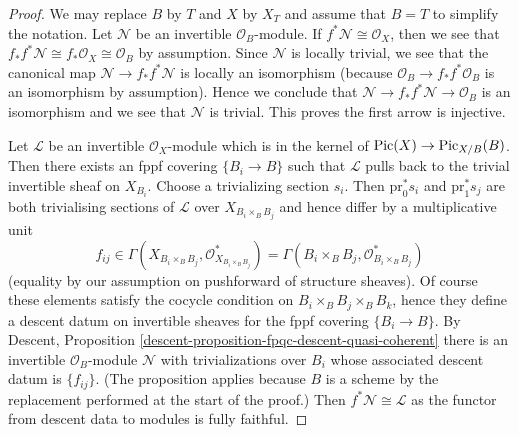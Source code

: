 \begin{proof}
We may replace $B$ by $T$ and $X$ by $X_T$ and assume that $B = T$
to simplify the notation. Let $\mathcal{N}$ be an invertible
$\mathcal{O}_B$-module. If $f^*\mathcal{N} \cong \mathcal{O}_X$, then
we see that $f_*f^*\mathcal{N} \cong f_*\mathcal{O}_X \cong \mathcal{O}_B$
by assumption. Since $\mathcal{N}$ is locally trivial, we see that
the canonical map $\mathcal{N} \to f_*f^*\mathcal{N}$ is locally
an isomorphism (because $\mathcal{O}_B \to f_*f^*\mathcal{O}_B$
is an isomorphism by assumption). Hence we conclude that
$\mathcal{N} \to f_*f^*\mathcal{N} \to \mathcal{O}_B$ is an isomorphism
and we see that $\mathcal{N}$ is trivial. This proves the first arrow
is injective.

\medskip\noindent
Let $\mathcal{L}$ be an invertible $\mathcal{O}_X$-module which is in
the kernel of $\mathop{\mathrm{Pic}}\nolimits(X) \to \mathrm{Pic}_{X/B}(B)$. Then there exists
an fppf covering $\{B_i \to B\}$ such that $\mathcal{L}$ pulls back
to the trivial invertible sheaf on $X_{B_i}$. Choose a trivializing
section $s_i$. Then $\text{pr}_0^*s_i$ and $\text{pr}_1^*s_j$ are both
trivialising sections of $\mathcal{L}$ over $X_{B_i \times_B B_j}$
and hence differ by a multiplicative unit
$$
f_{ij} \in
\Gamma(X_{B_i \times_B B_j}, \mathcal{O}_{X_{B_i \times_B B_j}}^*) =
\Gamma(B_i \times_B B_j, \mathcal{O}_{B_i \times_B B_j}^*)
$$
(equality by our assumption on pushforward of structure sheaves).
Of course these elements satisfy the cocycle condition on
$B_i \times_B B_j \times_B B_k$, hence they define a descent datum
on invertible sheaves for the fppf covering $\{B_i \to B\}$.
By Descent, Proposition \ref{descent-proposition-fpqc-descent-quasi-coherent}
there is an invertible $\mathcal{O}_B$-module $\mathcal{N}$
with trivializations over $B_i$ whose associated descent datum is
$\{f_{ij}\}$. (The proposition applies because $B$ is a scheme
by the replacement performed at the start of the proof.)
Then $f^*\mathcal{N} \cong \mathcal{L}$ as the
functor from descent data to modules is fully faithful.
\end{proof}

